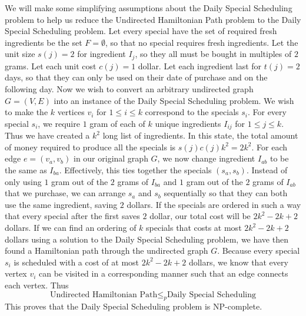 \documentclass[12pt]{article}
\begin{document}
We will make some simplifying assumptions about the Daily Special Scheduling problem to help us reduce the Undirected Hamiltonian Path problem
to the Daily Special Scheduling problem. Let every special have the set of required fresh ingredients be the set \(F=\emptyset\),
so that no special requires fresh ingredients. Let the unit size \(s(j)=2\) for ingredient \(I_j\), so they all must be bought in multiples
of \(2\) grams. Let each unit cost \(c(j)=1\) dollar. Let each ingredient last for \(t(j)=2\) days, so that they can only be used on their
date of purchase and on the following day. Now we wish to convert an arbitrary undirected graph \(G=(V,E)\) into an instance of the Daily
Special Scheduling problem. We wish to make the \(k\) vertices \(v_i\) for \(1\leq i\leq k\) correspond to the specials \(s_i\). For every
special \(s_i\), we require \(1\) gram of each of \(k\) unique ingredients \(I_{ij}\) for \(1\leq j\leq k\). Thus we have created a \(k^2\) long
list of ingredients. In this state, the total amount of money required to produce all the specials is \(s(j)c(j)k^2=2k^2\). For each edge
\(e=(v_a,v_b)\) in our original graph \(G\), we now change ingredient \(I_{ab}\) to be the same as \(I_{ba}\). Effectively, this ties together
the specials \((s_a,s_b)\). Instead of only using \(1\) gram out of the \(2\) grams of \(I_{ba}\) and \(1\) gram out of the \(2\) grams of \(I_{ab}\) that
we purchase, we can arrange \(s_a\) and \(s_b\) sequentially so that they can both use the same ingredient, saving \(2\) dollars. If the specials
are ordered in such a way that every special after the first saves \(2\) dollar, our total cost will be \(2k^2-2k+2\) dollars. If we can find an
ordering of \(k\) specials that costs at most \(2k^2-2k+2\) dollars using a solution to the Daily Special Scheduling problem, we have then found
a Hamiltonian path through the undirected graph \(G\). Because every special \(s_i\) is scheduled with a cost of at most \(2k^2-2k+2\) dollars,
we know that every vertex \(v_i\) can be visited in a corresponding manner such that an edge connects each vertex. Thus
\[\text{Undirected Hamiltonian Path}\leq_p \text{Daily Special Scheduling}\]
This proves that the Daily Special Scheduling problem is NP-complete.
\end{document}
